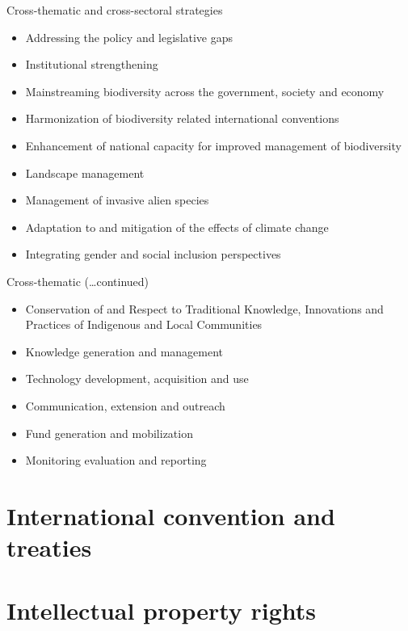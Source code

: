 \documentclass[
  ignorenonframetext,
  aspectratio=169]{beamer}
\providecommand{\tightlist}{%
  \setlength{\itemsep}{0pt}\setlength{\parskip}{0pt}}
\begin{document}
\begin{frame}{Cross-thematic and cross-sectoral strategies}
\protect\hypertarget{cross-thematic-and-cross-sectoral-strategies}{}
\begin{itemize}
\tightlist
\item
  Addressing the policy and legislative gaps
\item
  Institutional strengthening
\item
  Mainstreaming biodiversity across the government, society and economy
\item
  Harmonization of biodiversity related international conventions
\item
  Enhancement of national capacity for improved management of
  biodiversity
\item
  Landscape management
\item
  Management of invasive alien species
\item
  Adaptation to and mitigation of the effects of climate change
\item
  Integrating gender and social inclusion perspectives
\end{itemize}
\end{frame}

\begin{frame}{Cross-thematic (\ldots continued)}
\protect\hypertarget{cross-thematic-continued}{}
\begin{itemize}
\tightlist
\item
  Conservation of and Respect to Traditional Knowledge, Innovations and
  Practices of Indigenous and Local Communities
\item
  Knowledge generation and management
\item
  Technology development, acquisition and use
\item
  Communication, extension and outreach
\item
  Fund generation and mobilization
\item
  Monitoring evaluation and reporting
\end{itemize}
\end{frame}

\hypertarget{international-convention-and-treaties}{%
\section{International convention and
treaties}\label{international-convention-and-treaties}}

\hypertarget{intellectual-property-rights}{%
\section{Intellectual property
rights}\label{intellectual-property-rights}}
\end{document}
